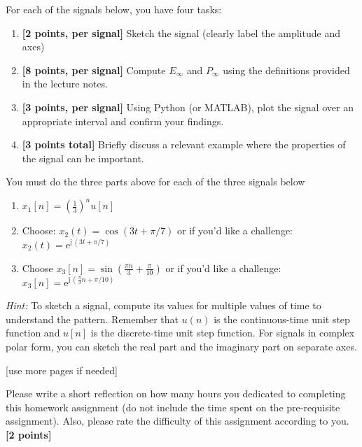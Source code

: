 \documentclass{ee102_pset}
\begin{document}
For each of the signals below, you have four tasks:
\begin{enumerate}
  \item \textbf{[2 points, per signal]} Sketch the signal (clearly label the amplitude and axes)
  \item \textbf{[8 points, per signal]} Compute \(E_{\infty}\) and \(P_{\infty}\) using the definitions provided in the lecture notes.
  \item \textbf{[3 points, per signal]} Using Python (or MATLAB), plot the signal over an appropriate interval and confirm your findings.
  \item \textbf{[3 points total]} Briefly discuss a relevant example where the properties of the signal can be important.
\end{enumerate}
You must do the three parts above for each of the three signals below
\begin{enumerate}
\item[(a)] $x_1[n] = \left(\tfrac{1}{3}\right)^{n} u[n]$

\item[(b)] Choose: $x_2(t) = \cos(3t + \pi/7)$ or if you'd like a challenge: $x_2(t) = \mathrm{e}^{\mathrm{j}\,(3t+\pi/7)}$

\item[(c)] Choose $x_3[n] = \sin(\frac{\pi n}{3} + \frac{\pi}{10})$ or if you'd like a challenge: $x_3[n] = \mathrm{e}^{\mathrm{j}\,(\tfrac{\pi}{3}n+\pi/10)}$
\end{enumerate}
\textit{Hint:} To sketch a signal, compute its values for multiple values of time to understand the pattern. Remember that $u(n)$ is the continuous-time unit step function and $u[n]$ is the discrete-time unit step function. For signals in complex polar form, you can sketch the real part and the imaginary part on separate axes.  
\vspace*{\fill}
\begin{center}
[use more pages if needed]
\end{center}

 Please write a short reflection on how many hours you dedicated to completing this homework assignment (do not include the time spent on the pre-requisite assignment). Also, please rate the difficulty of this assignment according to you. \textbf{[2 points]}
\end{document}
